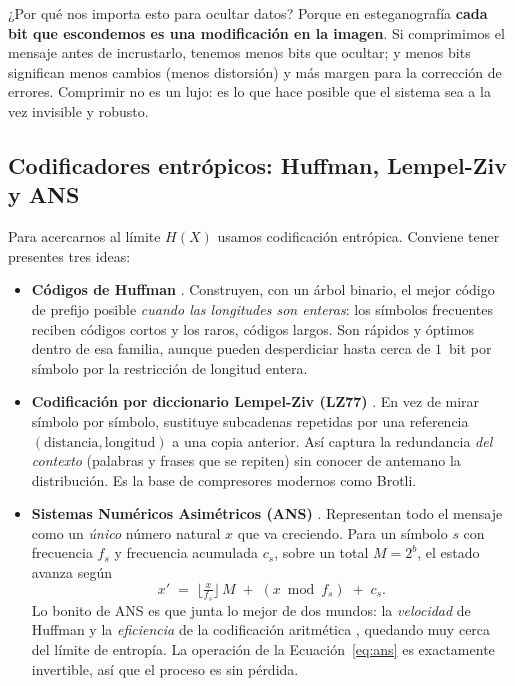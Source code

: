\documentclass[12pt,a4paper]{article}
\renewcommand{\nobreakdash}{}
\begin{document}
¿Por qué nos importa esto para ocultar datos? Porque en esteganografía \textbf{cada bit
que escondemos es una modificación en la imagen}. Si comprimimos el mensaje antes de
incrustarlo, tenemos menos bits que ocultar; y menos bits significan menos cambios (menos
distorsión) y más margen para la corrección de errores. Comprimir no es un lujo: es lo
que hace posible que el sistema sea a la vez invisible y robusto.

\subsection{Codificadores entrópicos: Huffman, Lempel\nobreakdash-Ziv y ANS}

Para acercarnos al límite $H(X)$ usamos codificación entrópica. Conviene tener presentes
tres ideas:

\begin{itemize}[leftmargin=1.6em]
\item \textbf{Códigos de Huffman} \cite{huffman1952}. Construyen, con un árbol binario, el
mejor código de prefijo posible \emph{cuando las longitudes son enteras}: los símbolos
frecuentes reciben códigos cortos y los raros, códigos largos. Son rápidos y óptimos
dentro de esa familia, aunque pueden desperdiciar hasta cerca de $1$~bit por símbolo por
la restricción de longitud entera.
\item \textbf{Codificación por diccionario Lempel\nobreakdash-Ziv (LZ77)}
\cite{zivlempel1977}. En vez de mirar símbolo por símbolo, sustituye subcadenas repetidas
por una referencia $(\text{distancia},\text{longitud})$ a una copia anterior. Así captura
la redundancia \emph{del contexto} (palabras y frases que se repiten) sin conocer de
antemano la distribución. Es la base de compresores modernos como Brotli.
\item \textbf{Sistemas Numéricos Asimétricos (ANS)} \cite{duda2014}. Representan todo el
mensaje como un \emph{único} número natural $x$ que va creciendo. Para un símbolo $s$ con
frecuencia $f_s$ y frecuencia acumulada $c_s$, sobre un total $M=2^{b}$, el estado avanza
según
\begin{equation}
x' \;=\; \Big\lfloor \tfrac{x}{f_s} \Big\rfloor\, M \;+\; (x \bmod f_s) \;+\; c_s .
\label{eq:ans}
\end{equation}
Lo bonito de ANS es que junta lo mejor de dos mundos: la \emph{velocidad} de Huffman y la
\emph{eficiencia} de la codificación aritmética \cite{rissanen1979}, quedando muy cerca
del límite de entropía. La operación de la Ecuación~\eqref{eq:ans} es exactamente
invertible, así que el proceso es sin pérdida.
\end{itemize}
\end{document}
